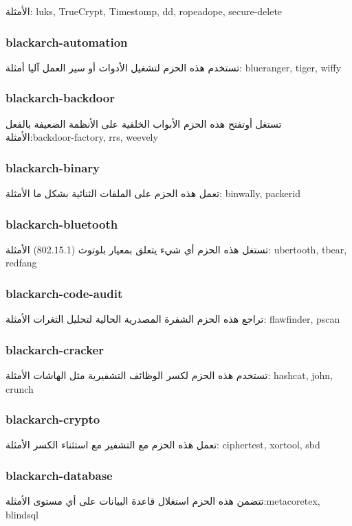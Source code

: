 \documentclass[a4paper, oneside, 11pt]{book}
\begin{document}
الأمثلة: luks, TrueCrypt, Timestomp, dd, ropeadope, secure-delete


\subsubsection{blackarch-automation}
تستخدم هذه الحزم لتشغيل الأدوات أو سير العمل آليا  
أمثلة: blueranger, tiger, wiffy 

\subsubsection{blackarch-backdoor}
 تستغل أوتفتح هذه الحزم الأبواب الخلفية على الأنظمة الضعيفة بالفعل
الأمثلة:backdoor-factory, rrs, weevely  


\subsubsection{blackarch-binary}
تعمل هذه الحزم على الملفات الثنائية بشكل ما
الأمثلة: binwally, packerid


\subsubsection{blackarch-bluetooth}
تستغل هذه الحزم أي شيء يتعلق بمعيار بلوتوث (802.15.1)
الأمثلة: ubertooth, tbear, redfang  


\subsubsection{blackarch-code-audit}
تراجع هذه الحزم الشفرة المصدرية الحالية لتحليل الثغرات
الأمثلة: flawfinder, pscan 


\subsubsection{blackarch-cracker}
تستخدم هذه الحزم لكسر الوظائف التشفيرية مثل الهاشات
الأمثلة: hashcat, john, crunch 


\subsubsection{blackarch-crypto}
تعمل هذه الحزم مع التشفير مع استثناء الكسر
الأمثلة: ciphertest, xortool, sbd 

\subsubsection{blackarch-database}
تتضمن هذه الحزم استغلال قاعدة البيانات على أي مستوى 
الأمثلة:metacoretex, blindsql
\end{document}
